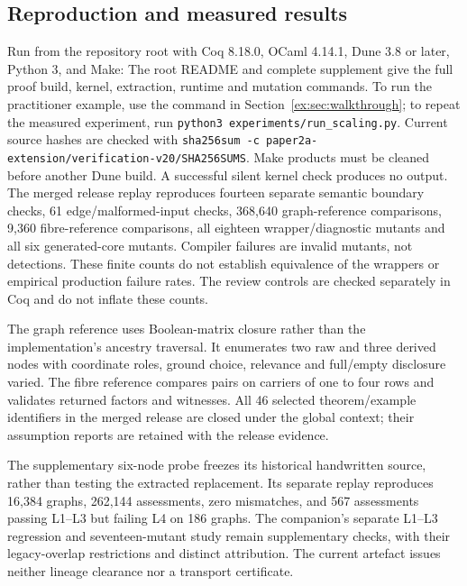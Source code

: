 \documentclass[twocolumn,envcountsect,envcountsame,natbib]{svjour3}
\begin{document}
\subsection{Reproduction and measured results}
Run from the repository root with Coq 8.18.0, OCaml 4.14.1, Dune 3.8 or later, Python 3, and Make:
The root README and complete supplement give the full proof build, kernel, extraction, runtime and mutation commands. To run the practitioner example, use the command in Section~\ref{ex:sec:walkthrough}; to repeat the measured experiment, run \nolinkurl{python3 experiments/run_scaling.py}. Current source hashes are checked with \nolinkurl{sha256sum -c paper2a-extension/verification-v20/SHA256SUMS}.
Make products must be cleaned before another Dune build. A successful silent kernel check produces no output. The merged release replay reproduces fourteen separate semantic boundary checks, 61 edge/malformed-input checks, 368,640 graph-reference comparisons, 9,360 fibre-reference comparisons, all eighteen wrapper/diagnostic mutants and all six generated-core mutants. Compiler failures are invalid mutants, not detections. These finite counts do not establish equivalence of the wrappers or empirical production failure rates. The review controls are checked separately in Coq and do not inflate these counts.

The graph reference uses Boolean-matrix closure rather than the implementation's ancestry traversal. It enumerates two raw and three derived nodes with coordinate roles, ground choice, relevance and full/empty disclosure varied. The fibre reference compares pairs on carriers of one to four rows and validates returned factors and witnesses. All 46 selected theorem/example identifiers in the merged release are closed under the global context; their assumption reports are retained with the release evidence.

The supplementary six-node probe freezes its historical handwritten source, rather than testing the extracted replacement. Its separate replay reproduces 16,384 graphs, 262,144 assessments, zero mismatches, and 567 assessments passing L1--L3 but failing L4 on 186 graphs. The companion's separate L1--L3 regression and seventeen-mutant study remain supplementary checks, with their legacy-overlap restrictions and distinct attribution. The current artefact issues neither lineage clearance nor a transport certificate.



\end{document}
